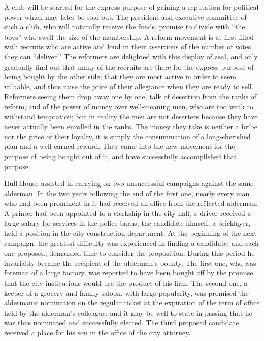 \documentclass[]{article}
\begin{document}
\begin{sectionbody}
\addamsparagraph A club will be started for the express purpose of gaining a reputation
for political power which may later be sold out. The president and
executive committee of such a club, who will naturally receive the
funds, promise to divide with ``the boys'' who swell the size of the
membership. A reform movement is at first filled with recruits who are
active and loud in their assertions of the number of votes they can
``deliver.'' The reformers are delighted with this display of zeal, and
only gradually find out that many of the recruits are there for the
express purpose of being bought by the other side; that they are most
active in order to seem valuable, and thus raise the price of their
allegiance when they are ready to sell. Reformers seeing them drop away
one by one, talk of desertion from the ranks of reform, and of the power
of money over well-meaning men, who are too weak to withstand
temptation; but in reality the men are not deserters because they have
never actually been enrolled in the ranks. The money they take is
neither a bribe nor the price of their loyalty, it is simply the
consummation of a long-cherished plan and a well-earned reward. They
came into the new movement for the purpose of being bought out of it,
and have successfully accomplished that purpose.

\addamsparagraph Hull-House assisted in carrying on two unsuccessful campaigns against
the same alderman. In the two years following the end of the first one,
nearly every man who had been prominent in it had received an office
from the reëlected alderman. A printer had been appointed to a clerkship
in the city hall; a driver received a large salary for services in the
police barns; the candidate himself, a bricklayer, held a position in
the city construction department. At the beginning of the next
campaign, the greatest difficulty was experienced in finding a
candidate, and each one proposed, demanded time to consider the
proposition. During this period he invariably became the recipient of
the alderman's bounty. The first one, who was foreman of a large
factory, was reported to have been bought off by the promise that the
city institutions would use the product of his firm. The second one, a
keeper of a grocery and family saloon, with large popularity, was
promised the aldermanic nomination on the regular ticket at the
expiration of the term of office held by the alderman's colleague, and
it may be well to state in passing that he was thus nominated and
successfully elected. The third proposed candidate received a place for
his son in the office of the city attorney.


\end{sectionbody}
\end{document}
